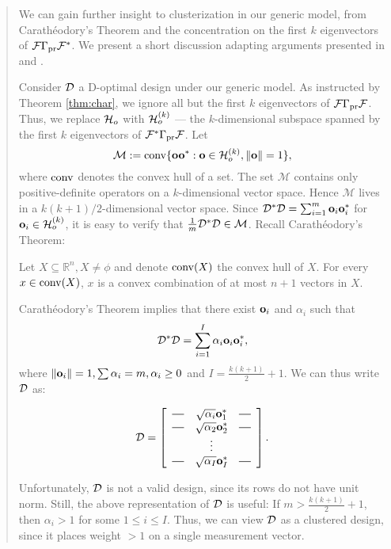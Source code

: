 \begin{quote}
  We can gain further insight to clusterization in our generic model,
  from Carath\'eodory's Theorem and the concentration on the first $k$
  eigenvectors of $\mathcal{F} \Gamma_{\textup{pr}} \mathcal{F}^*$. We present a short discussion
  adapting arguments presented in \cite[Chapter 3]{silvey1980} and
  \cite[Section 5.2.3]{pronzatoPazman2013}.

  Consider $\mathcal{D}$ a D-optimal design under our generic model.  As
  instructed by Theorem \ref{thm:char}, we ignore all but the first
  $k$ eigenvectors of $\mathcal{F} \Gamma_{\textup{pr}} \mathcal{F}$. Thus, we replace $\mathcal{H}_o$
  with $\mathcal{H}_o^{(k)}$ --- the $k$-dimensional subspace spanned by the
  first $k$ eigenvectors of $\mathcal{F}^*\Gamma_{\textup{pr}}\mathcal{F}$. Let
  \begin{equation*}
    \mathcal{M} := \operatorname*{conv} \{\mathbf{o} \mathbf{o}^* : \mathbf{o}\in \mathcal{H}_o^{(k)}, \|\mathbf{o}\|=1\},
  \end{equation*}
  where $\operatorname*{conv}$ denotes the convex hull of a set. The set
  $\mathcal{M}$ contains only positive-definite operators on a
  $k$-dimensional vector space. Hence $\mathcal{M}$ lives in a
  $k(k+1)/2$-dimensional vector space. Since $\mathcal{D}^*\mathcal{D} =
  \sum_{i=1}^m \mathbf{o}_i\mathbf{o}_i^*$ for $\mathbf{o}_i \in \mathcal{H}_o^{(k)}$, it is
  easy to verify that $\frac1m \mathcal{D}^*\mathcal{D} \in \mathcal{M}$.  Recall
  Carath\'eodory's Theorem:
  \begin{theorem*}
    Let $X \subseteq \mathbb{R}^n, X \neq \phi$ and denote $\operatorname*{conv} (X)$
    the convex hull of $X$. For every $x \in \operatorname*{conv} (X)$, $x$ is a convex
    combination of at most $n+1$ vectors in $X$.
  \end{theorem*}
  Carath\'eodory's Theorem implies that there exist $\mathbf{o}_i$ and
  $\alpha_i$ such that
  \begin{equation*}
    \mathcal{D}^*\mathcal{D} = \sum_{i=1}^I \alpha_i \mathbf{o}_i\mathbf{o}_i^*,
  \end{equation*}
  where $\|\mathbf{o}_i\|=1, \sum\alpha_i = m, \alpha_i \geq 0$ and $I =
  \frac{k(k+1)}{2} + 1$. We can thus write $\mathcal{D}$ as:
  
  \[
  \opt =
  \left[
    \begin{array}{ccc}
      \horzbar & \sqrt{\alpha_i} \meas^*_1 & \horzbar \\
      \horzbar & \sqrt{\alpha_2} \meas_2^* & \horzbar \\
      & \vdots    &          \\
      \horzbar & \sqrt{\alpha_I} \meas_I^* & \horzbar \\
    \end{array}
    \right].
  \]
  
  Unfortunately, $\mathcal{D}$ is not a valid design, since its rows do not
  have unit norm. Still, the above representation of $\mathcal{D}$ is useful:
  If $m > \frac{k(k+1)}{2} + 1$, then $\alpha_i > 1$ for some $1\leq i
  \leq I$.  Thus, we can view $\mathcal{D}$ as a clustered design, since it
  places weight $>1$ on a single measurement vector.
\end{quote}

